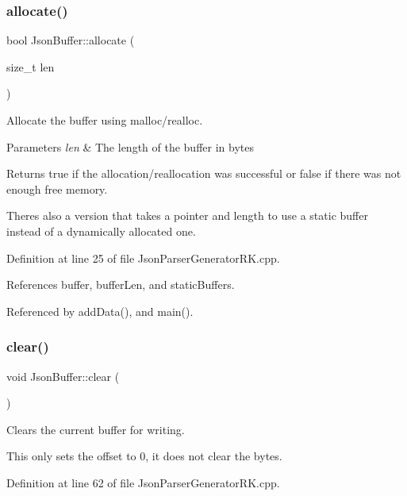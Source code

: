 \subsubsection{\texorpdfstring{allocate()}{allocate()}}
{\footnotesize\ttfamily bool Json\+Buffer\+::allocate (\begin{DoxyParamCaption}\item[{size\+\_\+t}]{len }\end{DoxyParamCaption})}



Allocate the buffer using malloc/realloc. 


\begin{DoxyParams}{Parameters}
{\em len} & The length of the buffer in bytes\\
\hline
\end{DoxyParams}
\begin{DoxyReturn}{Returns}
true if the allocation/reallocation was successful or false if there was not enough free memory.
\end{DoxyReturn}
There\textquotesingle{}s also a version that takes a pointer and length to use a static buffer instead of a dynamically allocated one. 

Definition at line 25 of file Json\+Parser\+Generator\+R\+K.\+cpp.



References buffer, buffer\+Len, and static\+Buffers.



Referenced by add\+Data(), and main().

\mbox{\label{class_json_buffer_a70969847d857815a9ded6450378e0e53}} 
\subsubsection{\texorpdfstring{clear()}{clear()}}
{\footnotesize\ttfamily void Json\+Buffer\+::clear (\begin{DoxyParamCaption}{ }\end{DoxyParamCaption})}



Clears the current buffer for writing. 

This only sets the offset to 0, it does not clear the bytes. 

Definition at line 62 of file Json\+Parser\+Generator\+R\+K.\+cpp.



